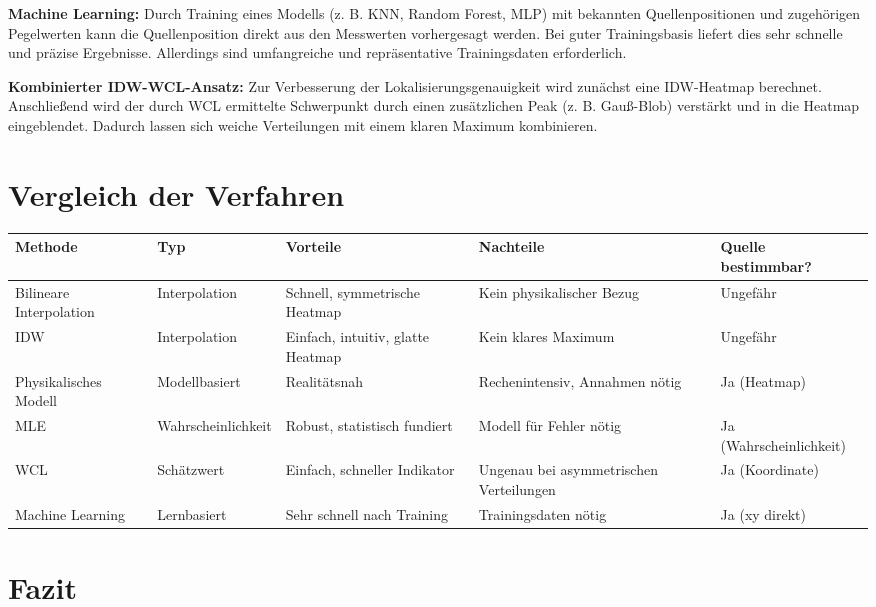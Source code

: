 \textbf{Machine Learning:}  
Durch Training eines Modells (z. B. KNN, Random Forest, MLP) mit bekannten Quellenpositionen und zugehörigen Pegelwerten kann die Quellenposition direkt aus den Messwerten vorhergesagt werden. Bei guter Trainingsbasis liefert dies sehr schnelle und präzise Ergebnisse. Allerdings sind umfangreiche und repräsentative Trainingsdaten erforderlich.

\textbf{Kombinierter IDW-WCL-Ansatz:}  
Zur Verbesserung der Lokalisierungsgenauigkeit wird zunächst eine IDW-Heatmap berechnet. Anschließend wird der durch WCL ermittelte Schwerpunkt durch einen zusätzlichen Peak (z. B. Gauß-Blob) verstärkt und in die Heatmap eingeblendet. Dadurch lassen sich weiche Verteilungen mit einem klaren Maximum kombinieren.

\section{Vergleich der Verfahren}

\begin{center}
\renewcommand{\arraystretch}{1.2}
\begin{adjustbox}{max width=\textwidth}
\begin{tabular}{|l|l|p{3cm}|p{3cm}|p{2.3cm}|}
\hline
\textbf{Methode} & \textbf{Typ} & \textbf{Vorteile} & \textbf{Nachteile} & \textbf{Quelle bestimmbar?} \\
\hline
Bilineare Interpolation & Interpolation & Schnell, symmetrische Heatmap & Kein physikalischer Bezug & Ungefähr \\
\hline
IDW & Interpolation & Einfach, intuitiv, glatte Heatmap & Kein klares Maximum & Ungefähr \\
\hline
Physikalisches Modell & Modellbasiert & Realitätsnah & Rechenintensiv, Annahmen nötig & Ja (Heatmap) \\
\hline
MLE & Wahrscheinlichkeit & Robust, statistisch fundiert & Modell für Fehler nötig & Ja (Wahrscheinlichkeit) \\
\hline
WCL & Schätzwert & Einfach, schneller Indikator & Ungenau bei asymmetrischen Verteilungen & Ja (Koordinate) \\
\hline
Machine Learning & Lernbasiert & Sehr schnell nach Training & Trainingsdaten nötig & Ja (xy direkt) \\
\hline
\end{tabular}
\end{adjustbox}
\end{center}

\section{Fazit}


